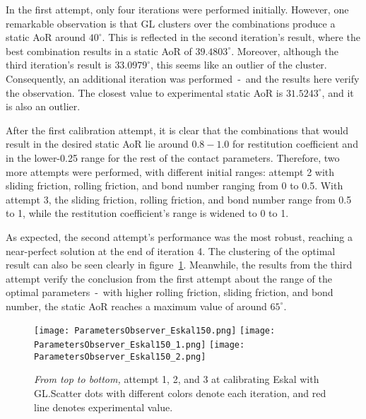 In the first attempt, only four iterations were performed initially. However, one remarkable observation is that GL clusters over the combinations produce a static AoR around $40^{\circ}$. This is reflected in the second iteration's result, where the best combination results in a static AoR of $39.4803^{\circ}$. Moreover, although the third iteration's result is $33.0979^{\circ}$, this seems like an outlier of the cluster. Consequently, an additional iteration was performed~-~and the results here verify the observation. The closest value to experimental static AoR is $31.5243^{\circ}$, and it is also an outlier. 

After the first calibration attempt, it is clear that the combinations that would result in the desired static AoR lie around $0.8-1.0$ for restitution coefficient and in the lower-0.25 range for the rest of the contact parameters. Therefore, two more attempts were performed, with different initial ranges: attempt 2 with sliding friction, rolling friction, and bond number ranging from 0 to 0.5. With attempt 3, the sliding friction, rolling friction, and bond number range from 0.5 to 1, while the restitution coefficient's range is widened to 0 to 1. 

As expected, the second attempt's performance was the most robust, reaching a near-perfect solution at the end of iteration 4. The clustering of the optimal result can also be seen clearly in figure~\ref{fig:EskalGL}. Meanwhile, the results from the third attempt verify the conclusion from the first attempt about the range of the optimal parameters~-~with higher rolling friction, sliding friction, and bond number, the static AoR reaches a maximum value of around $65^{\circ}$.

\begin{figure}[H]
    \centering
    \texttt{[image: ParametersObserver\_Eskal150.png]}
    \texttt{[image: ParametersObserver\_Eskal150\_1.png]}
    \texttt{[image: ParametersObserver\_Eskal150\_2.png]}
    \caption{\textit{From top to bottom,} attempt 1, 2, and 3 at calibrating Eskal with GL.\@ Scatter dots with different colors denote each iteration, and red line denotes experimental value.}\label{fig:EskalGL}
\end{figure}
    
